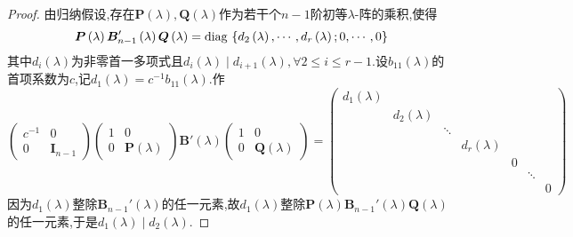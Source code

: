 {\begin{proof}
        由归纳假设,存在$\bm{P}\left(\lambda\right),\bm{Q}\left(\lambda\right)$作为若干个$n-1$阶初等$\lambda$-阵的乘积,使得
        \[
            \bm{P}\left(\lambda\right)\bm{B}_{n-1}'\left(\lambda\right)\bm{Q}\left(\lambda\right)=\operatorname{diag\,} \left\{
            d_2\left(\lambda\right),\cdots,d_r\left(\lambda\right);0,\cdots,0
            \right\}
        \]
        其中$d_i\left(\lambda\right)$为非零首一多项式且$d_i\left(\lambda\right)\mid d_{i+1}\left(\lambda\right),\forall 2\leqslant i\leqslant r-1$.设$b_{11}\left(\lambda\right)$的首项系数为$c$,记$d_1\left(\lambda\right)=c^{-1}b_{11}\left(\lambda\right).$作
        \[
            \begin{pmatrix}
                c^{-1} & 0 \\0 & \bm{I}_{n-1}
            \end{pmatrix}\begin{pmatrix}
                1 & 0 \\0 & \bm{P}\left(\lambda\right)
            \end{pmatrix}\bm{B}'\left(\lambda\right)\begin{pmatrix}
                1 & 0 \\0 & \bm{Q}\left(\lambda\right)
            \end{pmatrix}=
            \begin{pmatrix}
                d_1\left(\lambda\right) &                         &        &                         &   &        &   \\
                                        & d_2\left(\lambda\right) &        &                         &   &        &   \\
                                        &                         & \ddots &                         &   &        &   \\
                                        &                         &        & d_r\left(\lambda\right) &   &        &   \\
                                        &                         &        &                         & 0 &        &   \\
                                        &                         &        &                         &   & \ddots &   \\
                                        &                         &        &                         &   &        & 0
            \end{pmatrix}
        \]因为$d_1\left(\lambda\right)$整除$\bm{B}_{n-1}'\left(\lambda\right)$的任一元素,故$d_1\left(\lambda\right)$整除$\bm{P}\left(\lambda\right)\bm{B}_{n-1}'\left(\lambda\right)\bm{Q}\left(\lambda\right)$的任一元素,于是$d_1\left(\lambda\right)\mid d_2\left(\lambda\right)$.
    \end{proof}
}

